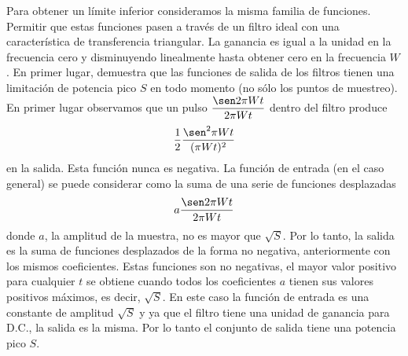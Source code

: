 Para obtener un l\'imite inferior consideramos la misma familia de
funciones. Permitir que estas funciones pasen a trav\'es de un filtro
ideal con una caracter\'istica de transferencia triangular. La
ganancia es igual a la unidad en la frecuencia cero y disminuyendo
linealmente hasta obtener cero en la frecuencia $W$. En primer lugar,
demuestra que las funciones de salida de los filtros tienen una
limitaci\'on de potencia pico $S$ en todo momento (no s\'olo los
puntos de muestreo). En primer lugar observamos que un pulso
$\dfrac{\sen 2 \pi Wt}{2 \pi Wt}$ dentro del filtro produce
\begin{equation}
  \dfrac{1}{2} \dfrac{\sen^2 \pi Wt}{(\pi Wt)^2}
\end{equation}
en la salida. Esta funci\'on nunca es negativa. La funci\'on de
entrada (en el caso general) se puede considerar como la suma de una
serie de funciones desplazadas
\begin{equation}
  a \dfrac{\sen 2 \pi Wt}{2 \pi Wt}
\end{equation}
donde $a$, la amplitud de la muestra, no es mayor que $\sqrt{S}$. Por
lo tanto, la salida es la suma de funciones desplazados de la forma
no negativa, anteriormente con los mismos coeficientes. Estas
funciones son no negativas, el mayor valor positivo para cualquier
$t$ se obtiene cuando todos los coeficientes $a$ tienen sus valores
positivos m\'aximos, es decir, $\sqrt{S}$. En este caso la funci\'on
de entrada es una constante de amplitud $\sqrt{S}$ y ya que el filtro
tiene una unidad de ganancia para D.C., la salida es la misma. Por lo
tanto el conjunto de salida tiene una potencia pico $S$.

